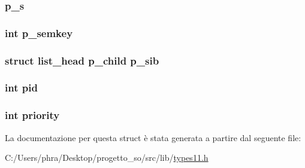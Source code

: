 \hypertarget{structpcb__t_ae1524fbfc37b7766b551477e48b3bf4d}{
\subsubsection[{p\-\_\-s}]{ p\-\_\-s}}\label{structpcb__t_ae1524fbfc37b7766b551477e48b3bf4d}
\hypertarget{structpcb__t_a831f803a73e91f4b1530e60bc24e92b4}{
\subsubsection[{p\-\_\-semkey}]{\setlength{\rightskip}{0pt plus 5cm}int p\-\_\-semkey}}\label{structpcb__t_a831f803a73e91f4b1530e60bc24e92b4}
\hypertarget{structpcb__t_ae571e01892f17d1ccf6332d96e6c5373}{
\subsubsection[{p\-\_\-sib}]{\setlength{\rightskip}{0pt plus 5cm}struct {\bf list\-\_\-head} p\-\_\-child p\-\_\-sib}}\label{structpcb__t_ae571e01892f17d1ccf6332d96e6c5373}
\hypertarget{structpcb__t_af500917c052066b40cf47f96b43c607b}{
\subsubsection[{pid}]{\setlength{\rightskip}{0pt plus 5cm}int pid}}\label{structpcb__t_af500917c052066b40cf47f96b43c607b}
\hypertarget{structpcb__t_acec9ce2df15222151ad66fcb1d74eb9f}{
\subsubsection[{priority}]{\setlength{\rightskip}{0pt plus 5cm}int priority}}\label{structpcb__t_acec9ce2df15222151ad66fcb1d74eb9f}


La documentazione per questa struct è stata generata a partire dal seguente file\-:\begin{DoxyCompactItemize}
\item 
C\-:/\-Users/phra/\-Desktop/progetto\-\_\-so/src/lib/\hyperlink{types11_8h}{types11.\-h}\end{DoxyCompactItemize}
